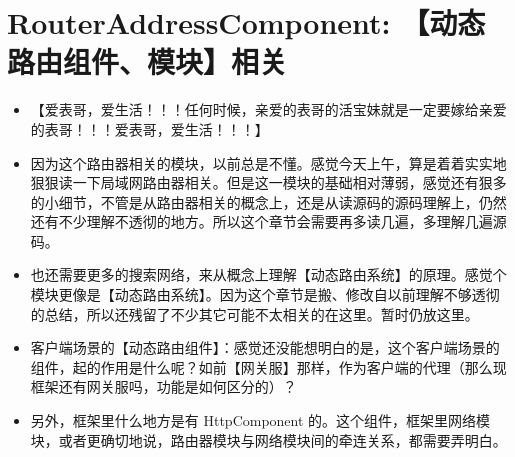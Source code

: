 \documentclass[9pt, b5paper]{article}
\begin{document}
\section{RouterAddressComponent: 【动态路由组件、模块】相关}
\label{sec-7}
\begin{itemize}
\item 【爱表哥，爱生活！！！任何时候，亲爱的表哥的活宝妹就是一定要嫁给亲爱的表哥！！！爱表哥，爱生活！！！】
\item 因为这个路由器相关的模块，以前总是不懂。感觉今天上午，算是着着实实地狠狠读一下局域网路由器相关。但是这一模块的基础相对薄弱，感觉还有狠多的小细节，不管是从路由器相关的概念上，还是从读源码的源码理解上，仍然还有不少理解不透彻的地方。所以这个章节会需要再多读几遍，多理解几遍源码。
\item 也还需要更多的搜索网络，来从概念上理解【动态路由系统】的原理。感觉个模块更像是【动态路由系统】。因为这个章节是搬、修改自以前理解不够透彻的总结，所以还残留了不少其它可能不太相关的在这里。暂时仍放这里。
\item 客户端场景的【动态路由组件】：感觉还没能想明白的是，这个客户端场景的组件，起的作用是什么呢？如前【网关服】那样，作为客户端的代理（那么现框架还有网关服吗，功能是如何区分的）？
\item 另外，框架里什么地方是有 HttpComponent 的。这个组件，框架里网络模块，或者更确切地说，路由器模块与网络模块间的牵连关系，都需要弄明白。
\end{itemize}
\end{document}

